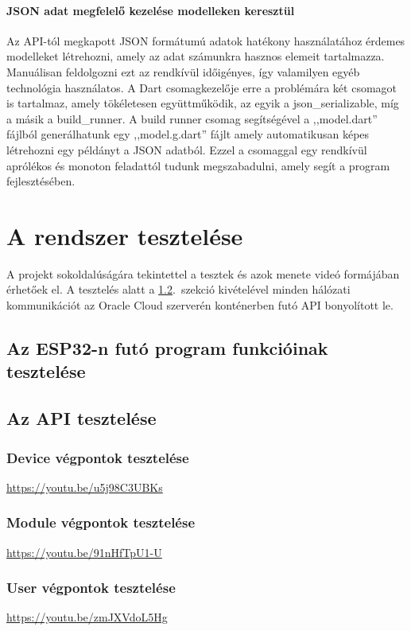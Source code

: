 \documentclass{thesis-ekf}
\theoremstyle{definition}
\theoremstyle{remark}
\begin{document}
	\subsubsection{JSON adat megfelelő kezelése modelleken keresztül}
	Az API-tól megkapott JSON formátumú adatok hatékony használatához érdemes modelleket létrehozni, amely az adat számunkra hasznos elemeit tartalmazza. Manuálisan feldolgozni ezt az rendkívül időigényes, így valamilyen egyéb technológia használatos. A Dart csomagkezelője erre a problémára két csomagot is tartalmaz, amely tökéletesen együttműködik, az egyik a json\_serializable\cite{bib_flutter_json_ser}, míg a másik a build\_runner\cite{bib_flutter_runner}. A build runner csomag segítségével a ,,model.dart'' fájlból generálhatunk egy ,,model.g.dart'' fájlt amely automatikusan képes létrehozni egy példányt a JSON adatból. Ezzel a csomaggal egy rendkívül aprólékos és monoton feladattól tudunk megszabadulni, amely segít a program fejlesztésében.
	 
	\chapter{A rendszer tesztelése}
	A projekt sokoldalúságára tekintettel a tesztek és azok menete videó formájában érhetőek el. A tesztelés alatt a \ref{sec_API_test}.~szekció kivételével minden hálózati kommunikációt az Oracle Cloud szerverén konténerben futó API bonyolított le.
	\section{Az ESP32-n futó program funkcióinak tesztelése}
	\section{Az API tesztelése}
	\label{sec_API_test}
	\subsection{Device végpontok tesztelése}
	\url{https://youtu.be/u5j98C3UBKs}
	\subsection{Module végpontok tesztelése}
	\url{https://youtu.be/91nHfTpU1-U}
	\subsection{User végpontok tesztelése}
	\url{https://youtu.be/zmJXVdoL5Hg}
\end{document}
